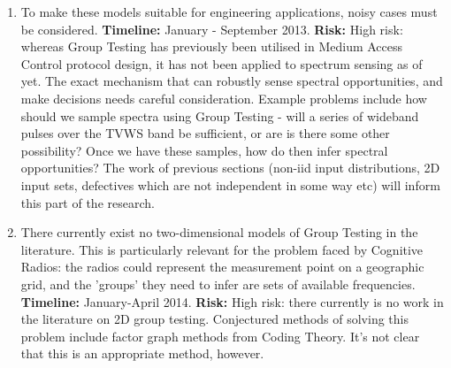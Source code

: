 \documentclass[12pt, a4paper]{article}
\begin{document}
\begin{enumerate}
\item To make these models suitable for engineering applications, noisy cases must be considered. \textbf{Timeline: } January - September 2013. \textbf{Risk: } High risk: whereas Group Testing has previously been utilised in Medium Access Control protocol design, it has not been applied to spectrum sensing as of yet. The exact mechanism that can robustly sense spectral opportunities, and make decisions needs careful consideration. Example problems include how should we sample spectra using Group Testing - will a series of wideband pulses over the TVWS band be sufficient, or are is there some other possibility? Once we have these samples, how do then infer spectral opportunities? The work of previous sections (non-iid input distributions, 2D input sets, defectives which are not independent in some way etc) will inform this part of the research. 

\item There currently exist no two-dimensional models of Group Testing in the literature. This is particularly relevant for the problem faced by Cognitive Radios: the radios could represent the measurement point on a geographic grid, and the 'groups' they need to infer are sets of available frequencies. \textbf{Timeline: }  January-April 2014. \textbf{Risk: } High risk: there currently is no work in the literature on 2D group testing. Conjectured methods of solving this problem include factor graph methods from Coding Theory. It's not clear that this is an appropriate method, however.

\end{enumerate}


\end{document}
